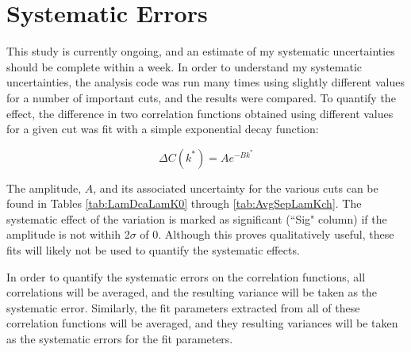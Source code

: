 \documentclass[../AnalysisNoteJBuxton.tex]{subfiles}
\begin{document}
\section{Systematic Errors}
\label{SystematicErrors}

This study is currently ongoing, and an estimate of my systematic uncertainties should be complete within a week.
In order to understand my systematic uncertainties, the analysis code was run many times using slightly different values for a number of important cuts, and the results were compared.
To quantify the effect, the difference in two correlation functions obtained using different values for a given cut was fit with a simple exponential decay function:

\begin{equation}
  \Delta C(k^{*}) = Ae^{-Bk^{*}}
\label{eqn:ExpDecay}
\end{equation}

The amplitude, $A$, and its associated uncertainty for the various cuts can be found in Tables \ref{tab:LamDcaLamK0} through \ref{tab:AvgSepLamKch}.
The systematic effect of the variation is marked as significant (``Sig" column) if the amplitude is not withih 2$\sigma$ of 0.
Although this proves qualitatively useful, these fits will likely not be used to quantify the systematic effects.

In order to quantify the systematic errors on the correlation functions, all correlations will be averaged, and the resulting variance will be taken as the systematic error.
Similarly, the fit parameters extracted from all of these correlation functions will be averaged, and they resulting variances will be taken as the systematic errors for the fit parameters.




\end{document}

